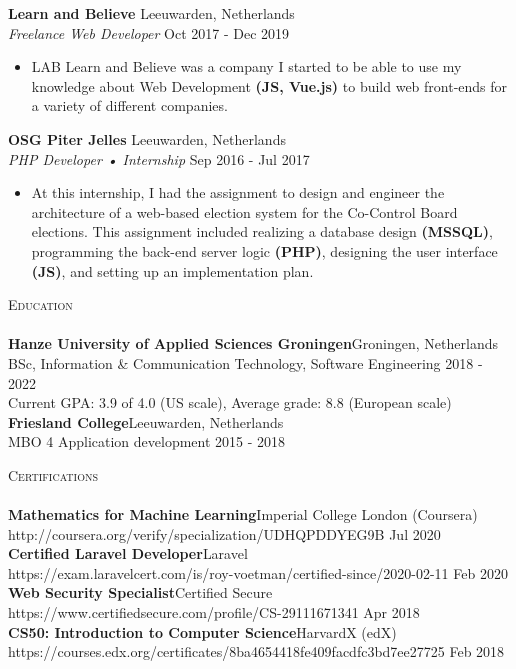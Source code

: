 \documentclass[a4paper]{article}
\newcommand{\lineunder} {
    \vspace*{-8pt} \\
    \hspace*{-18pt} \hrulefill \\
}
\newcommand{\header} [1] {
    {\hspace*{-18pt}\vspace*{6pt} \textsc{#1}}
    \vspace*{-6pt} \lineunder
}
\begin{document}
\textbf{Learn and Believe} \hfill Leeuwarden, Netherlands\\
\textit{Freelance Web Developer} \hfill Oct 2017 - Dec 2019\\
\vspace{-1mm}
\begin{itemize} \itemsep 1pt
	\item LAB Learn and Believe was a company I started to be able to use my knowledge about Web Development \textbf{(JS, Vue.js)} to build web front-ends for a variety of different companies.
\end{itemize}
\textbf{OSG Piter Jelles} \hfill Leeuwarden, Netherlands\\
\textit{PHP Developer • Internship} \hfill Sep 2016 - Jul 2017\\
\vspace{-1mm}
\begin{itemize} \itemsep 1pt
	\item At this internship, I had the assignment to design and engineer the architecture of a web-based election system for the Co-Control Board elections. This assignment included realizing a database design \textbf{(MSSQL)}, programming the back-end server logic \textbf{(PHP)}, designing the user interface \textbf{(JS)}, and setting up an implementation plan.
\end{itemize}

\header{Education}
\textbf{Hanze University of Applied Sciences Groningen}\hfill Groningen, Netherlands\\
BSc, Information \& Communication Technology, Software Engineering \hfill 2018 - 2022\\
Current GPA: 3.9 of 4.0 (US scale), Average grade: 8.8 (European scale)\\
\vspace{2mm}
\textbf{Friesland College}\hfill Leeuwarden, Netherlands\\
MBO 4 Application development \hfill 2015 - 2018\\
\vspace{2mm}

\header{Certifications}
\textbf{Mathematics for Machine Learning}\hfill Imperial College London (Coursera)\\
http://coursera.org/verify/specialization/UDHQPDDYEG9B \hfill Jul 2020\\
\vspace{2mm}
\textbf{Certified Laravel Developer}\hfill Laravel\\
https://exam.laravelcert.com/is/roy-voetman/certified-since/2020-02-11 \hfill Feb 2020\\
\vspace{2mm}
\textbf{Web Security Specialist}\hfill Certified Secure\\
https://www.certifiedsecure.com/profile/CS-29111671341 \hfill Apr 2018\\
\vspace{2mm}
\textbf{CS50: Introduction to Computer Science}\hfill HarvardX (edX)\\
https://courses.edx.org/certificates/8ba4654418fe409facdfc3bd7ee27725 \hfill Feb 2018\\
\vspace{2mm}
\end{document}
